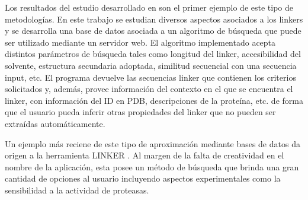 Los resultados del estudio desarrollado en \cite{george2002analysis} son el primer ejemplo de este tipo de metodologías.
En este trabajo se estudian diversos aspectos asociados a los linkers y se desarrolla una base de datos asociada a un algoritmo de búsqueda que puede ser utilizado mediante un servidor web\cite{linkerdbIBIVU}.
El algoritmo implementado acepta distintos parámetros de búsqueda tales como longitud del linker, accesibilidad del solvente, estructura secundaria adoptada, similitud secuencial con una secuencia input, etc.
El programa devuelve las secuencias linker que contienen los criterios solicitados y, además, provee información del contexto en el que se encuentra el linker, con información del ID en PDB, descripciones de la proteína, etc. 
de forma que el usuario pueda inferir otras propiedades del linker que no pueden ser extraídas automáticamente.

Un ejemplo más reciene de este tipo de aproximación mediante bases de datos da origen a la herramienta LINKER \cite{crasto2000linker,xue2004linker}.
Al margen de la falta de creatividad en el nombre de la aplicación, esta posee un método de búsqueda que brinda una gran cantidad de opciones al usuario incluyendo aspectos experimentales como la sensibilidad a la actividad de proteasas.

